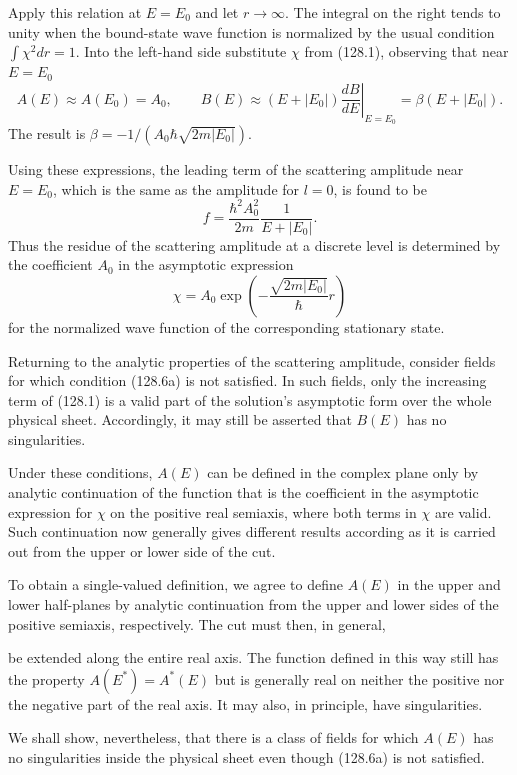 Apply this relation at $E=E_0$ and let $r\to\infty$. The integral on the right tends to unity when the bound-state wave function is normalized by the usual condition $\int\chi^2dr=1$. Into the left-hand side substitute $\chi$ from (128.1), observing that near $E=E_0$
\[
 A(E)\approx A(E_0)=A_0,\qquad
 B(E)\approx(E+|E_0|)\left.\frac{dB}{dE}\right|_{E=E_0}=\beta(E+|E_0|).
\]
The result is $\beta=-1/(A_0\hbar\sqrt{2m|E_0|})$.

Using these expressions, the leading term of the scattering amplitude near $E=E_0$, which is the same as the amplitude for $l=0$, is found to be
\begin{equation}
 f=\frac{\hbar^2A_0^2}{2m}\frac1{E+|E_0|}.
 \tag{128.11}
\end{equation}
Thus the residue of the scattering amplitude at a discrete level is determined by the coefficient $A_0$ in the asymptotic expression
\begin{equation}
 \chi=A_0\exp\left(-\frac{\sqrt{2m|E_0|}}{\hbar}r\right)
 \tag{128.12}
\end{equation}
for the normalized wave function of the corresponding stationary state.

Returning to the analytic properties of the scattering amplitude, consider fields for which condition (128.6a) is not satisfied. In such fields, only the increasing term of (128.1) is a valid part of the solution's asymptotic form over the whole physical sheet. Accordingly, it may still be asserted that $B(E)$ has no singularities.

Under these conditions, $A(E)$ can be defined in the complex plane only by analytic continuation of the function that is the coefficient in the asymptotic expression for $\chi$ on the positive real semiaxis, where both terms in $\chi$ are valid. Such continuation now generally gives different results according as it is carried out from the upper or lower side of the cut.

To obtain a single-valued definition, we agree to define $A(E)$ in the upper and lower half-planes by analytic continuation from the upper and lower sides of the positive semiaxis, respectively. The cut must then, in general,

be extended along the entire real axis. The function defined in this way still has the property $A(E^*)=A^*(E)$ but is generally real on neither the positive nor the negative part of the real axis. It may also, in principle, have singularities.

We shall show, nevertheless, that there is a class of fields for which $A(E)$ has no singularities inside the physical sheet even though (128.6a) is not satisfied.

